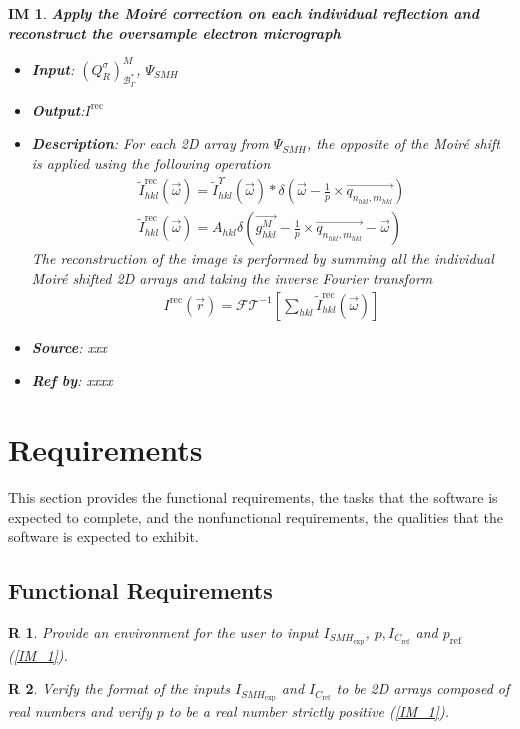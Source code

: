 \documentclass[12pt]{article}
\newtheorem{IM}{IM}
\newtheorem{R}{R}
\begin{document}
\begin{IM}
\label{IM_5}
\noindent\colorbox{shadecolorIM}{\normalfont \textbf{Apply the Moir{\'e} correction on each individual reflection and reconstruct the oversample electron micrograph}}
\normalfont
\begin{itemize}
\item \textbf{Input}: $(Q^{\sigma}_{R})^{M}_{\mathcal{B}_{\Gamma}^{*}}$, $\Psi_{SMH}$
\item \textbf{Output}:$I^{\text{rec}}$
\item \textbf{Description}: For each 2D array from $\Psi_{SMH}$, the opposite of the Moir{\'e} shift is applied using the following operation
\begin{equation*}
\begin{gathered}
\tilde{I}_{hkl}^{\text{rec}}(\vec{\omega}) = \tilde{I}_{hkl}^{\Upsilon}(\vec{\omega}) \ast \delta(\overrightarrow{\omega} - \frac{1}{p} \times \overrightarrow{q_{n_{hkl},m_{hkl}}}) \\
\tilde{I}_{hkl}^{\text{rec}}(\vec{\omega}) = A_{hkl}\delta(\overrightarrow{g_{hkl}^{M}} - \frac{1}{p} \times \overrightarrow{q_{n_{hkl},m_{hkl}}} -\overrightarrow{\omega})
\end{gathered}
\end{equation*}
The reconstruction of the image is performed by summing all the individual Moir{\'e} shifted 2D arrays and taking the inverse Fourier transform
\begin{equation*}
\begin{gathered}
I^{\text{rec}}(\vec{r}) = \mathcal{FT}^{-1}[\sum_{hkl} \tilde{I}_{hkl}^{\text{rec}}(\vec{\omega})]
\end{gathered}
\end{equation*}
\item \textbf{Source}: xxx
\item \textbf{Ref by}: xxxx
\end{itemize}
\end{IM}

\section{Requirements}

This section provides the functional requirements, the tasks that the software 
is expected to complete, and the nonfunctional requirements, the qualities that 
the software is expected to exhibit.

\subsection{Functional Requirements}

\begin{R}
\label{R_1}
\normalfont Provide an environment for the user to input 
$I_{\mathit{SMH}_{\text{exp}}}$, $p,  I_{C_{\text{ref}}}$ and $p_{\text{ref}}$ 
(\cref{IM_1}).
\end{R}
\begin{R}
\label{R_2}
\normalfont Verify the format of the inputs $I_{\mathit{SMH}_{\text{exp}}}$ and 
$I_{C_{\text{ref}}}$ to be 2D arrays composed of real numbers and verify $p$ to 
be a real number strictly positive (\cref{IM_1}).
\end{R}
\end{document}
